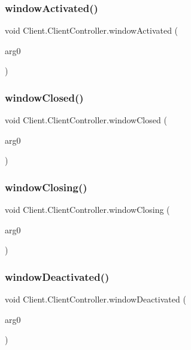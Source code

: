 \subsubsection{window\+Activated()}
{\footnotesize\ttfamily void Client.\+Client\+Controller.\+window\+Activated (\begin{DoxyParamCaption}\item[{Window\+Event}]{arg0 }\end{DoxyParamCaption})}

\mbox{\label{class_client_1_1_client_controller_a4abe5253578a84811c3e509e780cdde3}} 
\subsubsection{window\+Closed()}
{\footnotesize\ttfamily void Client.\+Client\+Controller.\+window\+Closed (\begin{DoxyParamCaption}\item[{Window\+Event}]{arg0 }\end{DoxyParamCaption})}

\mbox{\label{class_client_1_1_client_controller_aec89f03c59f73f47d2fd0cd5c49bb53a}} 
\subsubsection{window\+Closing()}
{\footnotesize\ttfamily void Client.\+Client\+Controller.\+window\+Closing (\begin{DoxyParamCaption}\item[{Window\+Event}]{arg0 }\end{DoxyParamCaption})}

\mbox{\label{class_client_1_1_client_controller_a3f18c5e46a035a8da65b4938e52188f7}} 
\subsubsection{window\+Deactivated()}
{\footnotesize\ttfamily void Client.\+Client\+Controller.\+window\+Deactivated (\begin{DoxyParamCaption}\item[{Window\+Event}]{arg0 }\end{DoxyParamCaption})}

